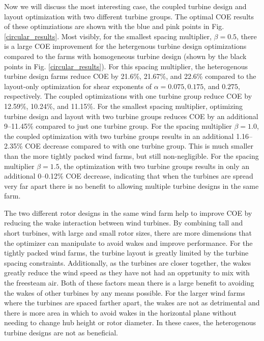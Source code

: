 \documentclass[wes, manuscript]{copernicus}
\providecommand{\DIFaddend}{} %
\begin{document}
\DIFaddend Now we will discuss the most interesting case, the coupled turbine design and layout optimization with two different turbine groups. The optimal COE results of these optimziations are shown with the blue and pink points in Fig. \ref{circular_results}. Most visibly, for the smallest spacing multiplier, $\beta=0.5$, there is a large COE improvement for the hetergenous turbine design optimizations compared to the farms with homogeneous turbine design (shown by the black points in Fig. \ref{circular_results}). For this spacing multiplier, the heterogenous turbine design farms reduce COE by 21.6\%, 21.67\%, and 22.6\% compared to the layout-only optimization for shear exponents of $\alpha=0.075,0.175$, and $0.275$, respectively. The coupled optimizations with one turbine group reduce COE by 12.59\%, 10.24\%, and 11.15\%. For the smallest spacing multiplier, optimizing turbine design and layout with two turbine groups reduces COE by an additional 9--11.45\% compared to just one turbine group. For the spacing multiplier $\beta=1.0$, the coupled optimization with two turbine groups results in an additional 1.16--2.35\% COE decrease compared to with one turbine group. This is much smaller than the more tightly packed wind farms, but still non-negligible. For the spacing multiplier $\beta=1.5$, the optimization with two turbine groups results in only an additional 0--0.12\% COE decrease, indicating that when the turbines are spread very far apart there is no benefit to allowing multiple turbine designs in the same farm.

The two different rotor designs in the same wind farm help to improve COE by reducing the wake interaction between wind turbines. By combining tall and short turbines, with large and small rotor sizes, there are more dimensions that the optimizer can manipulate to avoid wakes and improve performance. For the tightly packed wind farms, the turbine layout is greatly limited by the turbine spacing constraints. Additionally, as the turbines are closer together, the wakes greatly reduce the wind speed as they have not had an opprtunity to mix with the freesteam air. Both of these factors mean there is a large benefit to avoiding the wakes of other turbines by any means possible. For the larger wind farms where the turbines are spaced farther apart, the wakes are not as detrimental and there is more area in which to avoid wakes in the horizontal plane without needing to change hub height or rotor diameter. In these cases, the heterogenous turbine designs are not as beneficial.
\end{document}
